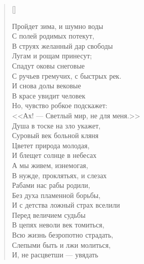 \newpage
\vspace*{0cm}


\settowidth{\versewidth}{В струях желанный дар свободы}
\begin{verse}[\versewidth]
\begin{altverse}
Пройдет зима, и шумно воды\\
    С полей родимых потекут,\\
В струях желанный дар свободы\\
    Лугам и рощам принесут;\\
Спадут оковы снеговые\\
    С ручьев гремучих, с быстрых рек.\\
И снова долы вековые\\
    В красе увидит человек\ldotst\\
Но, чувство робкое подскажет:\\
    <<Ах! --- Светлый мир, не для меня.>>\\
Душа в тоске на зло укажет,\\
    Суровый век больной кляня\ldotst\\
Цветет природа молодая,\\
    И блещет солнце в небесах\ldotst\\
А мы живем, изнемогая,\\
    В нужде, проклятьях, и слезах\ldotst\\
Рабами нас рабы родили,\\
    Без духа пламенной борьбы,\\
И с детства ложный страх вселили\\
    Перед величием судьбы\ldotst\\
В цепях неволи век томиться,\\
    Всю жизнь безропотно страдать,\\
Слепыми быть и лжи молиться,\\
И, не расцветши --- увядать\ldotst
\end{altverse}
\end{verse}

\newpage
\vspace*{0cm}




\newpage
\vspace*{0cm}

